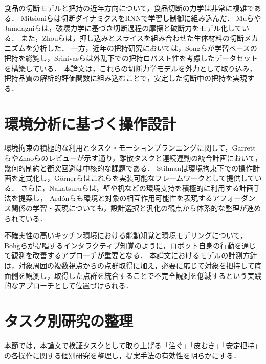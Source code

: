 食品の切断モデルと把持の近年方向について，食品切断の力学は非常に複雑である．
Mitsioniら\cite{Mitsioni2021FoodCuttingDynamics}は切断ダイナミクスをRNNで学習し制御に組み込んだ．
Muら\cite{Mu2019RoboticCutting}やJamdagniら\cite{Jamdagni2019FractureMechanicsCutting}は，破壊力学に基づき切断過程の摩擦と破断力をモデル化している．
また，Zhouら\cite{Zhou2006PressingSlicingCutting_1, Zhou2006PressingSlicingCutting_2}は，押し込みとスライスを組み合わせた生体材料の切断メカニズムを分析した．
一方，近年の把持研究においては，Songら\cite{Song2025DexterousGraspingOverview}が学習ベースの把持を総覧し，Srinivasら\cite{Srinivas2025GraspFactory}は外乱下での把持ロバスト性を考慮したデータセットを構築している．
本論文は，これらの切断力学モデルを外力として取り込み，把持品質の解析的評価関数に組み込むことで，安定した切断中の把持を実現する．

\section{環境分析に基づく操作設計}
環境拘束の積極的な利用とタスク・モーションプランニングに関して，Garrettら\cite{Garrett2021TAMPSurvey}やZhaoら\cite{Zhao2024OptTAMPSurvey}のレビューが示す通り，離散タスクと連続運動の統合計画において，幾何的制約と衝突回避は中核的な課題である．
Stilman\cite{Stilman2011ConstrainedManipulation}は環境拘束下での操作計画を定式化し，Görnerら\cite{Gorner2019MoveItTaskConstructor}はこれらを実装可能なフレームワークとして提供している．
さらに，Nakatsuruら\cite{Nakatsuru2023EnvironmentSupport}は，壁や机などの環境支持を積極的に利用する計画手法を提案し，
Ard{\'o}nら\cite{Ardon2021AffordanceReview}も環境と対象の相互作用可能性を表現するアフォーダンス関係の学習・表現についても，設計選択と汎化の観点から体系的な整理が進められている．

不確実性の高いキッチン環境における能動知覚と環境モデリングについて，Bohgら\cite{Bohg2016InteractivePerception}が提唱するインタラクティブ知覚のように，ロボット自身の行動を通じて観測を改善するアプローチが重要となる．
本論文におけるモデルの計測方針は，対象周囲の複数視点からの点群取得に加え，必要に応じて対象を把持して底面側を観測し，取得した点群を統合することで不完全観測を低減するという実践的なアプローチとして位置づけられる．

\section{タスク別研究の整理}
本節では，本論文で検証タスクとして取り上げる「注ぐ」「皮むき」「安定把持」の各操作に関する個別研究を整理し，提案手法の有効性を明らかにする．

